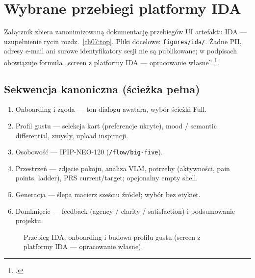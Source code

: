 \chapter{Wybrane przebiegi platformy IDA}
\label{app:h:top}

Załącznik zbiera zanonimizowaną dokumentację przebiegów UI artefaktu IDA --- uzupełnienie rycin rozdz.~\ref{ch07:top}. Pliki docelowe: \texttt{figures/ida/}. Żadne PII, adresy e-mail ani surowe identyfikatory sesji nie są publikowane; w podpisach obowiązuje formuła „screen z platformy IDA --- opracowanie własne” \footcite{idaPlatform2026}.

\section{Sekwencja kanoniczna (ścieżka pełna)}
\label{app:h:sec:full}

\begin{enumerate}
  \item Onboarding i zgoda --- ton dialogu awatara, wybór ścieżki Full.
  \item Profil gustu --- selekcja kart (preferencje ukryte), mood / semantic differential, zmysły, upload inspiracji.
  \item Osobowość --- IPIP-NEO-120 (\texttt{/flow/big-five}).
  \item Przestrzeń --- zdjęcie pokoju, analiza VLM, potrzeby (aktywności, pain points, ladder), PRS current/target; opcjonalny empty shell.
  \item Generacja --- ślepa macierz sześciu źródeł; wybór bez etykiet.
  \item Domknięcie --- feedback (agency / clarity / satisfaction) i podsumowanie projektu.
\end{enumerate}

\begin{figure}[htbp]
  \centering
  \caption{Przebieg IDA: onboarding i budowa profilu gustu (screen z platformy IDA --- opracowanie własne).}
  \label{fig:app:h:onboarding}
\end{figure}

